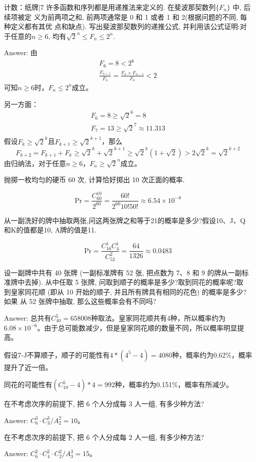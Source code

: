 \newChapter 计数\uppercase\expandafter{}：纸牌|7
\exer 许多函数和序列都是用递推法来定义的. 在斐波那契数列$\{F_n\}$ 中, 后续项被定 义为前两项之和, 前两项通常是 0 和 1 或者 1 和 2(根据问题的不同, 每种定义都有其优 点和缺点). 写出斐波那契数列的递推公式, 并利用该公式证明:对于任意的$n\ge 6$, 均有$\sqrt{2}^n \le F_n\le 2^n$.\par
Answer: 由
\begin{gather*}
F_6= 8 < 2^6 \\
\frac{F_{n+1}}{F_n}=\frac{F_{n}+F_{n-1}}{F_n} < 2 
\end{gather*}
可知$n\ge 6$时，$F_n\le 2^n$成立。\par
另一方面：
\begin{gather*}
F_6=8\ge \sqrt2^6=8 \\
F_7=13\ge \sqrt2^7\approx 11.313 \\
\end{gather*}
假设$F_k\ge\sqrt2^k$且$F_{k+1}\ge\sqrt2^{k+1}$，那么
\[F_{k+2}=F_{k+1}+F_k\ge\sqrt2^k+\sqrt2^{k+1}\ge\sqrt2^k(1+\sqrt2)>2\sqrt2^k=\sqrt2^{k+2}\]
由归纳法，对于任意$n\ge 6$，$F_n\ge \sqrt2^n$成立。

\exer 抛掷一枚均匀的硬币 60 次, 计算恰好掷出 10 次正面的概率.\par
\[\mathrm{Pr}=\frac{C_60^10}{2^{60}}=\frac{60!}{2^{60}10!50!}\approx 6.54\times 10^{-8}\]

\exer 从一副洗好的牌中抽取两张,问这两张牌之和等于21的概率是多少?假设10、J、Q和K的值都是10, A牌的值是11.\par
\[\mathrm{Pr}=\frac{C_{16}^1C_4^1}{C_52^2}=\frac{64}{1326}\approx 0.0483\]

\exer 设一副牌中共有 40 张牌 (一副标准牌有 52 张, 把点数为 7、8 和 9 的牌从一副标准牌中去掉). 从中任取 5 张牌, 问取到顺子的概率是多少?取到同花的概率呢?取 到皇家同花顺 (即从 10 开始的顺子, 并且所有牌具有相同的花色) 的概率是多少?如果 从 52 张牌中抽取, 那么这些概率会有不同吗?\par
Answer: 总共有$C_{40}^5=658008$种取法。皇家同花顺共有4种，所以概率约为$6.08\times10^{-6}$。由于总可能数减少，但是皇家同花顺的数量不同，所以概率明显提高。\par
假设7-J不算顺子，顺子的可能性有$4*(4^5-4)=4080$种，概率约为0.62\%，概率提升了近一倍。\par
同花的可能性有$(C_{10}^5-4)*4=992$种，概率约为0.151\%，概率有所减少。

\exer 在不考虑次序的前提下, 把 6 个人分成每 3 人一组, 有多少种方法?\par
Answer: $C_6^3\cdot C_3^3 / A_2^2=10$。

\exer 在不考虑次序的前提下, 把 6 个人分成每 2 人一组, 有多少种方法?\par
Answer: $C_6^2\cdot C_4^2\cdot C_2^2 / A_3^3=15$。